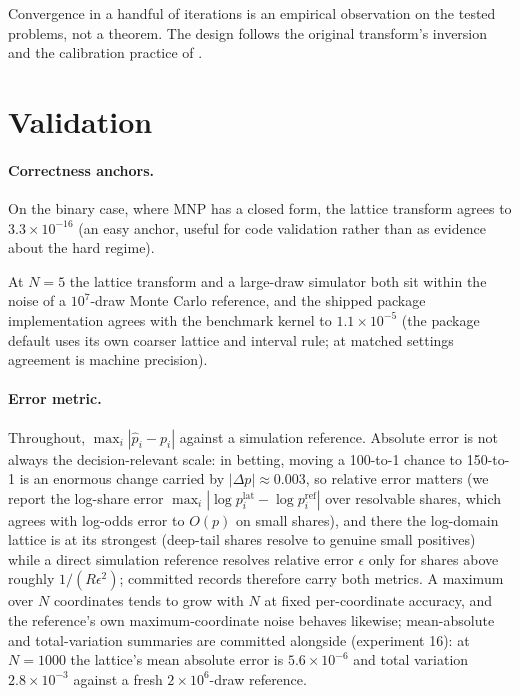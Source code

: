 \documentclass[12pt]{article}
\theoremstyle{remark}
\begin{document}
Convergence in a handful of iterations is an empirical observation on the
tested problems, not a theorem. The design follows the original transform's
inversion \citep{cotton2021} and the calibration practice of
\citet{allocationpkg}.

\section{Validation}\label{sec:benchmark}

\paragraph{Correctness anchors.} On the binary case, where MNP has a
closed form, the lattice transform agrees to $3.3\times10^{-16}$ (an easy
anchor, useful for code validation rather than as evidence about the hard
regime).

At $N=5$ the lattice transform and a large-draw simulator both sit
within the noise of a $10^7$-draw Monte Carlo reference, and the shipped
package implementation agrees with the benchmark kernel to
$1.1\times10^{-5}$ (the package default uses its own coarser lattice
and interval rule; at matched settings agreement is machine precision).

\paragraph{Error metric.} Throughout, $\max_i |\hat p_i - p_i|$ against a
simulation reference. Absolute error is not always the decision-relevant
scale: in betting, moving a 100-to-1 chance to 150-to-1 is an enormous
change carried by $|\Delta p| \approx 0.003$, so relative error matters
(we report the log-share error $\max_i |\log p^{\mathrm{lat}}_i -
\log p_i^{\mathrm{ref}}|$ over resolvable shares, which agrees with
log-odds error to $O(p)$ on small shares), and there the log-domain lattice is at its strongest (deep-tail shares
resolve to genuine small positives) while a direct simulation reference resolves
relative error $\epsilon$ only for shares above roughly
$1/(R\epsilon^2)$; committed records therefore carry both metrics. A maximum over $N$ coordinates tends to grow with $N$ at fixed
per-coordinate accuracy, and the reference's own maximum-coordinate noise
behaves likewise; mean-absolute and total-variation summaries are committed
alongside (experiment 16): at $N=1000$ the lattice's mean absolute error is
$5.6\times10^{-6}$ and total variation $2.8\times10^{-3}$ against a fresh
$2\times10^6$-draw reference.
\end{document}

